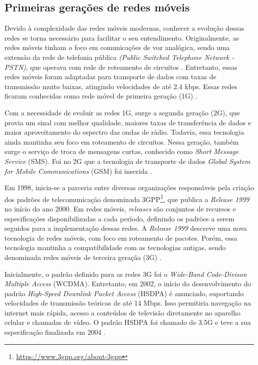 \subsection{Primeiras gerações de redes móveis}

Devido à complexidade das redes móveis modernas, conhecer a evolução dessas redes se torna necessário para facilitar o seu entendimento. Originalmente, as redes móveis tinham o foco em comunicações de voz analógica, sendo uma extensão da rede de telefonia pública \textit{(Public Switched Telephone Network - PSTN)}, que operava com rede de roteamento de circuitos \cite{Cardoso2020}.
Entretanto, essas redes móveis foram adaptadas para transporte de dados com taxas de transmissão muito baixas, atingindo velocidades de até 2.4 kbps. Essas redes ficaram conhecidas como rede móvel de primeira geração (1G) \cite{vora2015evolution}.

Com a necessidade de evoluir as redes 1G, surge a segunda geração (2G), que provia um sinal com melhor qualidade, maiores taxas de transferência de dados e maior aproveitamento do espectro das ondas de rádio.
Todavia, essa tecnologia ainda mantinha seu foco em roteamento de circuitos.
Nessa geração, também surge o serviço de troca de mensagens curtas, conhecido como \textit{Short Message Service} (SMS).
Foi no 2G que a tecnologia de transporte de dados \textit{Global System for Mobile Communications} (GSM) foi inserida \cite{bhalla2010generations}.

Em 1998, inicia-se a parceria entre diversas organizações responsáveis pela criação dos padrões de telecomunicação denominada 3GPP\footnote{\url{https://www.3gpp.org/about-3gpp}}, que publica a \textit{Release 1999} no início do ano 2000.
Em redes móveis, \textit{releases} são conjuntos de recursos e especificações disponibilizadas a cada período, definindo os padrões a serem seguidos para a implementação dessas redes.
A \textit{Release 1999} descreve uma nova tecnologia de redes móveis, com foco em roteamento de pacotes.
Porém, essa tecnologia mantinha a compatibilidade com as tecnologias antigas, sendo denominada redes móveis de terceira geração (3G) \cite{3gpp.01.01}.

Inicialmente, o padrão definido para as redes 3G foi o \textit{Wide-Band Code-Divison Multiple Access} (WCDMA).
Entretanto, em 2002, o início do desenvolvimento do padrão \textit{High-Speed Downlink Packet Access} (HSDPA) é anunciado, suportando velocidades de transmissão teóricas de até 14 Mbps. Isso permitiria navegação na internet mais rápida, acesso a conteúdos de televisão diretamente no aparelho celular e chamadas de vídeo. O padrão HSDPA foi chamado de 3.5G e teve a sua especificação finalizada em 2004 \cite{Lamba2012}.

